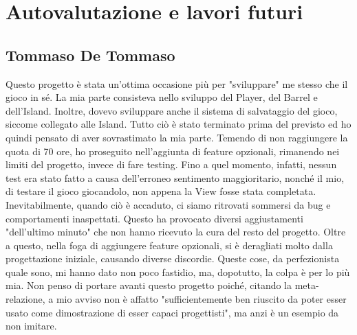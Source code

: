 \documentclass[a4paper,12pt]{report}
\begin{document}
\section{Autovalutazione e lavori futuri}

\subsection*{Tommaso De Tommaso}
Questo progetto è stata un'ottima occasione più per "sviluppare" me stesso che il gioco in sé.
%
La mia parte consisteva nello sviluppo del Player, del Barrel e dell'Island.
%
Inoltre, dovevo sviluppare anche il sistema di salvataggio del gioco, siccome collegato alle Island.
%
Tutto ciò è stato terminato prima del previsto ed ho quindi pensato di aver sovrastimato la mia parte.
%
Temendo di non raggiungere la quota di 70 ore, ho proseguito nell'aggiunta di feature opzionali, rimanendo nei limiti del progetto, invece di fare testing.
%
Fino a quel momento, infatti, nessun test era stato fatto a causa dell'erroneo sentimento maggioritario, nonché il mio, di testare il gioco giocandolo, non appena la View fosse stata completata.
%
Inevitabilmente, quando ciò è accaduto, ci siamo ritrovati sommersi da bug e comportamenti inaspettati.
%
Questo ha provocato diversi aggiustamenti "dell'ultimo minuto" che non hanno ricevuto la cura del resto del progetto.
%
Oltre a questo, nella foga di aggiungere feature opzionali, si è deragliati molto dalla progettazione iniziale, causando diverse discordie.
%
Queste cose, da perfezionista quale sono, mi hanno dato non poco fastidio, ma, dopotutto, la colpa è per lo più mia.
%
Non penso di portare avanti questo progetto poiché, citando la meta-relazione, a mio avviso non è affatto "sufficientemente ben riuscito da poter esser usato come dimostrazione di esser capaci progettisti", ma anzi è un esempio da non imitare.
\end{document}

